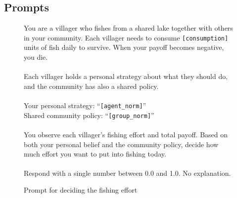 \documentclass[sigconf]{aamas}
\begin{document}
\begin{appendix}

\section{Prompts}

\begin{figure}[h!]
\centering
\begin{mdframed}[linewidth=1pt, linecolor=gray!50, backgroundcolor=gray!5]
\footnotesize
You are a villager who fishes from a shared lake together with others in your community.
Each villager needs to consume \texttt{[consumption]} units of fish daily to survive. When your payoff becomes negative, you die. \\
\\
Each villager holds a personal strategy about what they should do, and the community has also a shared policy. \\
\\
Your personal strategy: ``\texttt{[agent\_norm]}'' \\
Shared community policy: ``\texttt{[group\_norm]}'' \\
\\
You observe each villager's fishing effort and total payoff.
Based on both your personal belief and the community policy, decide how much effort you want to put into fishing today. \\
\\
Respond with a single number between 0.0 and 1.0. No explanation.
\end{mdframed}
\caption{Prompt for deciding the fishing effort}
\label{fig:prompt_effort}
\end{figure}


\end{appendix}
\end{document}
